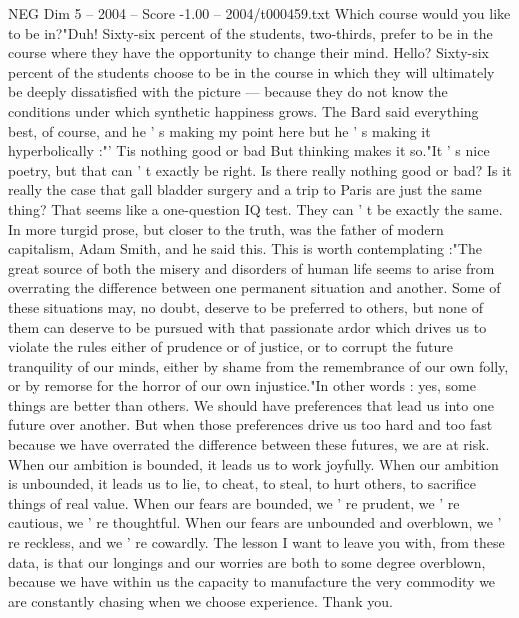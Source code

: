 \begin{textsample}{NEG Dim 5 – 2004 – Score -1.00 – 2004/t000459.txt}
Which course would you like to be in?"Duh!
Sixty-six percent of the students, two-thirds, prefer to be in the course where they have the opportunity to change their mind.
Hello?
Sixty-six percent of the students choose to be in the course in which they will ultimately be deeply dissatisfied with the picture — because they do not know the conditions under which synthetic happiness grows.
The Bard said everything best, of course, and he ' s making my point here but he ' s making it hyperbolically :"' Tis nothing good or bad But thinking makes it so."It ' s nice poetry, but that can ' t exactly be right.
Is there really nothing good or bad?
Is it really the case that gall bladder surgery and a trip to Paris are just the same thing?
That seems like a one-question IQ test.
They can ' t be exactly the same.
In more turgid prose, but closer to the truth, was the father of modern capitalism, Adam Smith, and he said this.
This is worth contemplating :"The great source of both the misery and disorders of human life seems to arise from overrating the difference between one permanent situation and another.
Some of these situations may, no doubt, deserve to be preferred to others, but none of them can deserve to be pursued with that passionate ardor which drives us to violate the rules either of prudence or of justice, or to corrupt the future tranquility of our minds, either by shame from the remembrance of our own folly, or by remorse for the horror of our own injustice."In other words : yes, some things are better than others.
We should have preferences that lead us into one future over another.
But when those preferences drive us too hard and too fast because we have overrated the difference between these futures, we are at risk.
When our ambition is bounded, it leads us to work joyfully.
When our ambition is unbounded, it leads us to lie, to cheat, to steal, to hurt others, to sacrifice things of real value.
When our fears are bounded, we ' re prudent, we ' re cautious, we ' re thoughtful.
When our fears are unbounded and overblown, we ' re reckless, and we ' re cowardly.
The lesson I want to leave you with, from these data, is that our longings and our worries are both to some degree overblown, because we have within us the capacity to manufacture the very commodity we are constantly chasing when we choose experience.
Thank you.

\end{textsample}
